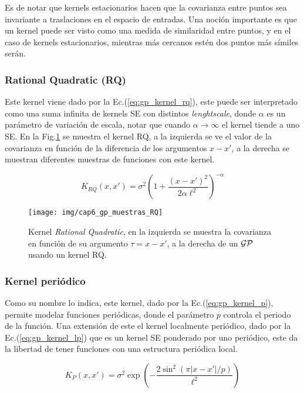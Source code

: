Es de notar que kernels estacionarios hacen que la covarianza entre puntos sea invariante a traslaciones en el espacio de entradas. Una noción importante es que un kernel puede ser visto como una medida de similaridad entre puntos, y en el caso de kernels estacionarios, mientras más cercanos estén dos puntos más símiles serán.

\subsubsection{Rational Quadratic (RQ)}

Este kernel viene dado por la Ec.(\ref{eq:gp_kernel_rq}), este puede ser interpretado como una suma infinita de kernels SE con distintos \textit{lenghtscale}, donde $\alpha$ es un parámetro de variación de escala, notar que cuando $\alpha \rightarrow \infty$ el kernel tiende a uno SE. En la Fig.\ref{fig:gp_6} se muestra el kernel RQ, a la izquierda se ve el valor de la covarianza en función de la diferencia de los argumentos $x-x'$, a la derecha se muestran diferentes muestras de funciones con este kernel.
 
\begin{equation}\label{eq:gp_kernel_rq}
	K_{RQ}(x, x') = \sigma^2 \left(1 + \frac{\left( x- x'\right)^2}{2\alpha\ell^2 } \right)^{-\alpha}
\end{equation}


\begin{figure}[H]
	\centering
	\texttt{[image: img/cap6\_gp\_muestras\_RQ]}
	\caption{Kernel \textit{Rational Quadratic}, en la izquierda se muestra la covarianza en función de su argumento $\tau=x-x'$, a la derecha de un $\mathcal{GP}$ usando un kernel RQ.}
	\label{fig:gp_6}
\end{figure}

\subsubsection{Kernel periódico}

Como su nombre lo indica, este kernel, dado por la Ec.(\ref{eq:gp_kernel_p}), permite modelar funciones periódicas, donde el parámetro $p$ controla el periodo de la función. Una extensión de este el kernel localmente periódico, dado por la Ec.(\ref{eq:gp_kernel_lp}) que es un kernel SE ponderado por uno periódico, este da la libertad de tener funciones con una estructura periódica local.


\begin{equation}\label{eq:gp_kernel_p}
	K_{P}(x, x') = \sigma^2 \exp\left(-\frac{2\sin^2\left(\pi |x- x'| / p \right)}{\ell^2 } \right)
\end{equation}

